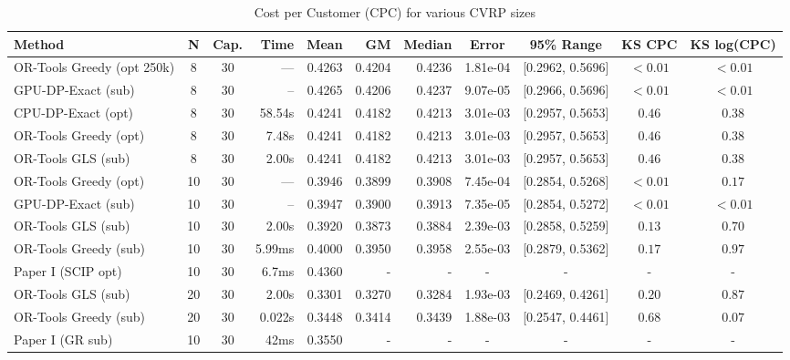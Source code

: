 \documentclass[a4paper,twoside]{article}
\begin{document}
\begin{table}[htbp]
\centering
\caption{Cost per Customer (CPC) for various CVRP sizes}
\label{tab:benchmark-comparison}
\small
\begin{tabular}{@{}l c c r r r r c c c c@{}}
\toprule
\textbf{Method} & \textbf{N} & \textbf{Cap.} & \textbf{Time} & \textbf{Mean} & \textbf{GM} & \textbf{Median} & \textbf{Error} & \textbf{95\% Range} & \textbf{KS CPC} & \textbf{KS log(CPC)} \\
\midrule
OR-Tools Greedy (opt 250k) & 8 & 30 & — & 0.4263 & 0.4204 & 0.4236 & 1.81e-04 & [0.2962, 0.5696] & $<0.01$ & $<0.01$ \\
GPU-DP-Exact (sub)   & 8  & 30 & -- & 0.4265 & 0.4206 & 0.4237 & 9.07e-05 & [0.2966, 0.5696] & $<0.01$ & $<0.01$ \\
CPU-DP-Exact (opt)    & 8 & 30 & 58.54s & 0.4241 & 0.4182 & 0.4213 & 3.01e-03 & [0.2957, 0.5653] & $0.46$ & $0.38$ \\
OR-Tools Greedy (opt) & 8 & 30 & 7.48s & 0.4241 & 0.4182 & 0.4213 & 3.01e-03 & [0.2957, 0.5653] & $0.46$ & $0.38$ \\
OR-Tools GLS (sub)    & 8 & 30 & 2.00s & 0.4241 & 0.4182 & 0.4213 & 3.01e-03 & [0.2957, 0.5653] & $0.46$ & $0.38$ \\
\midrule
OR-Tools Greedy (opt) & 10 & 30 & — & 0.3946 & 0.3899 & 0.3908 & 7.45e-04 & [0.2854, 0.5268] & $<0.01$ & $0.17$ \\
GPU-DP-Exact (sub)   & 10 & 30 & --     & 0.3947 & 0.3900 & 0.3913 & 7.35e-05 & [0.2854, 0.5272] & $<0.01$ & $<0.01$ \\
OR-Tools GLS (sub)    & 10 & 30 & 2.00s  & 0.3920 & 0.3873 & 0.3884 & 2.39e-03 & [0.2858, 0.5259] & $0.13$ & $0.70$ \\
OR-Tools Greedy (sub) & 10 & 30 & 5.99ms & 0.4000 & 0.3950 & 0.3958 & 2.55e-03 & [0.2879, 0.5362] & $0.17$ & $0.97$ \\
\rowcolor{gray!20}  Paper I (SCIP opt)    & 10 & 30 & 6.7ms  & 0.4360 & -      & -      & -        & - & - &- \\             
\midrule
OR-Tools GLS (sub)    & 20 & 30 & 2.00s & 0.3301 & 0.3270 & 0.3284 & 1.93e-03 & [0.2469, 0.4261] & $0.20$ & $0.87$ \\
OR-Tools Greedy (sub) & 20 & 30 & 0.022s & 0.3448 & 0.3414 & 0.3439 & 1.88e-03 & [0.2547, 0.4461] & $0.68$ & $0.07$ \\
\rowcolor{gray!20}  Paper I (GR sub)      & 10 & 30 & 42ms  & 0.3550 & -      & -      & -        & - & - &- \\             

\end{tabular}
\end{table}
\end{document}
